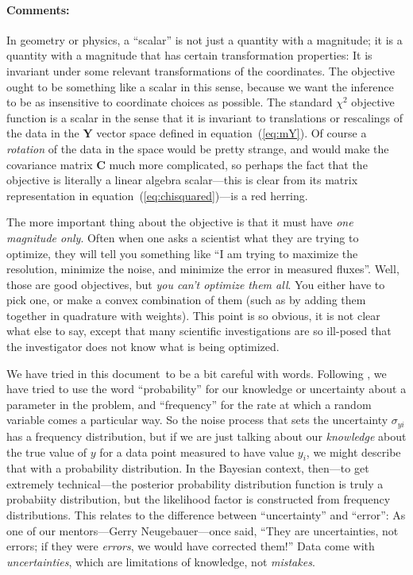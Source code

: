 \documentclass[12pt,twoside]{article}
\newcommand{\documentname}{document}
\newcommand{\equationname}{equation}
\newcommand{\commentsname}{Comments}
\newcounter{problem}
\newenvironment{comments}{\paragraph{\commentsname:}}{}
\newcommand{\mmatrix}[1]{\boldsymbol{#1}}
\newcommand{\mC}{\mmatrix{C}}
\newcommand{\mY}{\mmatrix{Y}}
\begin{document}
\begin{comments}
In geometry or physics, a ``scalar'' is not just a quantity with a
magnitude; it is a quantity with a magnitude that has certain
transformation properties: It is invariant under some relevant
transformations of the coordinates.  The objective ought to be
something like a scalar in this sense, because we want the inference
to be as insensitive to coordinate choices as possible.  The standard
$\chi^2$ objective function is a scalar in the sense that it is
invariant to translations or rescalings of the data in the $\mY$
vector space defined in \equationname~(\ref{eq:mY}).  Of course a
\emph{rotation} of the data in the space would be pretty strange, and
would make the covariance matrix $\mC$ much more complicated, so
perhaps the fact that the objective is literally a linear algebra
scalar---this is clear from its matrix representation in
\equationname~(\ref{eq:chisquared})---is a red herring.

The more important thing about the objective is that it must have
\emph{one magnitude only}.  Often when one asks a scientist what they
are trying to optimize, they will tell you something like ``I am
trying to maximize the resolution, minimize the noise, and minimize
the error in measured fluxes''.  Well, those are good objectives, but
\emph{you can't optimize them all}.  You either have to pick one, or
make a convex combination of them (such as by adding them together in
quadrature with weights).  This point is so obvious, it is not clear
what else to say, except that many scientific investigations are so
ill-posed that the investigator does not know what is being optimized.

We have tried in this \documentname\ to be a bit careful with words.
Following \citet{jaynes}, we have tried to use the word
``probability'' for our knowledge or uncertainty about a parameter in
the problem, and ``frequency'' for the rate at which a random variable
comes a particular way.  So the noise process that sets the
uncertainty $\sigma_{yi}$ has a frequency distribution, but if we are
just talking about our \emph{knowledge} about the true value of $y$
for a data point measured to have value $y_i$, we might describe that
with a probability distribution.  In the Bayesian context, then---to
get extremely technical---the posterior probability distribution
function is truly a probabiity distribution, but the likelihood factor
is constructed from frequency distributions.  This relates to the
difference between ``uncertainty'' and ``error'': As one of our
mentors---Gerry Neugebauer---once said, ``They are uncertainties, not
errors; if they were \emph{errors}, we would have corrected them!''
Data come with \emph{uncertainties}, which are limitations of
knowledge, not \emph{mistakes}.


\end{comments}
\end{document}
